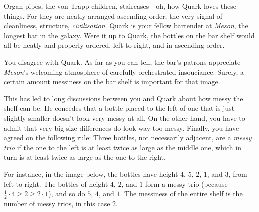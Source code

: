 

\noindent
Organ pipes, the von Trapp children, staircases---oh, how Quark loves these things.
For they are neatly arranged ascending order, the very signal of cleanliness, structure, \emph{civilisation}.
Quark is your fellow bartender at \emph{Meson}, the longest bar in the galaxy.
Were it up to Quark, the bottles on the bar shelf would all be neatly and properly ordered, left-to-right, and in ascending order.

You disagree with Quark.
As far as you can tell, the bar's patrons appreciate \emph{Meson}'s welcoming atmosphere of carefully orchestrated insouciance. 
Surely, a certain amount messiness on the bar shelf is important for that image.

This has led to long discussions between you and Quark about how messy the shelf can be.
He concedes that a bottle placed to the left of one that is just slightly smaller doesn't look very messy at all.
On the other hand, you have to admit that very big size differences do look way too messy.
Finally, you have agreed on the following rule:
Three bottles, not necessarily adjacent, are a \emph{messy trio} if the one to the left is at least twice as large as the middle one, which in turn is at least twice as large as the one to the right.

\medskip
For instance, in the image below, the bottles have height $4$, $5$, $2$, $1$, and $3$, from left to right.
The bottles of height $4$, $2$, and $1$ form a messy trio (because $\frac12 \cdot 4 \geq 2\geq 2\cdot  1$), and so do $5$, $4$, and $1$.
The messiness of the entire shelf is the number of messy trios, in this case $2$.

\medskip
\includegraphics[width= 0.3]{img/messy_bottles.png}



